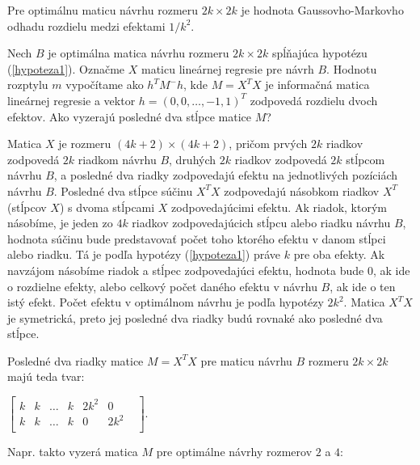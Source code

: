 \begin{prop}
Pre optimálnu maticu návrhu rozmeru $2k \times 2k$ je hodnota Gaussovho-Markovho odhadu rozdielu medzi efektami $1/k^2$.
\end{prop}

\begin{dokaz}
Nech $B$ je optimálna matica návrhu rozmeru $2k \times 2k$ spĺňajúca hypotézu (\ref{hypoteza1}). Označme $X$ maticu lineárnej regresie pre návrh $B$. Hodnotu rozptylu $m$ vypočítame ako $h^T M^- h$,
kde $M = X^T X$ je informačná matica lineárnej regresie a vektor $h = (0, 0, \ldots, -1, 1)^T $ zodpovedá rozdielu dvoch efektov. Ako vyzerajú posledné dva stĺpce matice $M$?

Matica $X$ je rozmeru $(4k + 2) \times (4k + 2)$, pričom prvých $2k$ riadkov zodpovedá $2k$ riadkom návrhu $B$, druhých $2k$ riadkov zodpovedá $2k$ stĺpcom návrhu $B$,
a posledné dva riadky zodpovedajú efektu na jednotlivých pozíciách návrhu $B$. Posledné dva stĺpce súčinu $X^T X$ zodpovedajú násobkom riadkov $X^T$ (stĺpcov $X$) s dvoma stĺpcami $X$ zodpovedajúcimi efektu.
Ak riadok, ktorým násobíme, je jeden zo $4k$ riadkov zodpovedajúcich stĺpcu alebo riadku návrhu $B$, hodnota súčinu bude predstavovať počet toho ktorého efektu v danom stĺpci alebo riadku.
Tá je podľa hypotézy (\ref{hypoteza1}) práve $k$ pre oba efekty. Ak navzájom násobíme riadok a stĺpec zodpovedajúci efektu, hodnota bude $0$, ak ide o rozdielne efekty,
alebo celkový počet daného efektu v návrhu $B$, ak ide o ten istý efekt. Počet efektu v optimálnom návrhu je podľa hypotézy $2k^2$.
Matica $X^T X$ je symetrická, preto jej posledné dva riadky budú rovnaké ako posledné dva stĺpce.

Posledné dva riadky matice $M = X^T X$ pre maticu návrhu $B$ rozmeru $2k \times 2k$ majú teda tvar:

\begin{center}
$
\begin{bmatrix}
k & k & \ldots & k & 2k^2 & 0 & \\
k & k & \ldots & k & 0 & 2k^2 & \\
\end{bmatrix}
$.
\end{center}

Napr. takto vyzerá matica $M$ pre optimálne návrhy rozmerov $2$ a $4$:


\end{dokaz}
